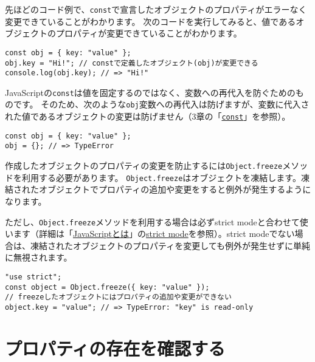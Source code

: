 \begin{tcolorbox}[enhanced jigsaw,breakable,title=constで定義したオブジェクトは変更可能]\label{const-and-object}

先ほどのコード例で、\texttt{const}で宣言したオブジェクトのプロパティがエラーなく変更できていることがわかります。
次のコードを実行してみると、値であるオブジェクトのプロパティが変更できていることがわかります。

\begin{lstlisting}
const obj = { key: "value" };
obj.key = "Hi!"; // constで定義したオブジェクト(obj)が変更できる
console.log(obj.key); // => "Hi!"
\end{lstlisting}

JavaScriptの\texttt{const}は値を固定するのではなく、変数への再代入を防ぐためのものです。
そのため、次のような\texttt{obj}変数への再代入は防げますが、変数に代入された値であるオブジェクトの変更は防げません（3章の「\hyperlink{const}{\texttt{const}}」を参照）。

\begin{lstlisting}
const obj = { key: "value" };
obj = {}; // => TypeError
\end{lstlisting}

作成したオブジェクトのプロパティの変更を防止するには\texttt{Object.freeze}メソッドを利用する必要があります。
\texttt{Object.freeze}はオブジェクトを凍結します。凍結されたオブジェクトでプロパティの追加や変更をすると例外が発生するようになります。

ただし、\texttt{Object.freeze}メソッドを利用する場合は必ずstrict
modeと合わせて使います（詳細は「\hyperlink{what-is-javascript}{JavaScriptとは}」の\hyperlink{strict-mode}{strict mode}を参照）。strict
modeでない場合は、凍結されたオブジェクトのプロパティを変更しても例外が発生せずに単純に無視されます。

\begin{lstlisting}
"use strict";
const object = Object.freeze({ key: "value" });
// freezeしたオブジェクトにはプロパティの追加や変更ができない
object.key = "value"; // => TypeError: "key" is read-only
\end{lstlisting}
\end{tcolorbox}

\hypertarget{confirm-property}{%
\section{プロパティの存在を確認する}\label{confirm-property}}

